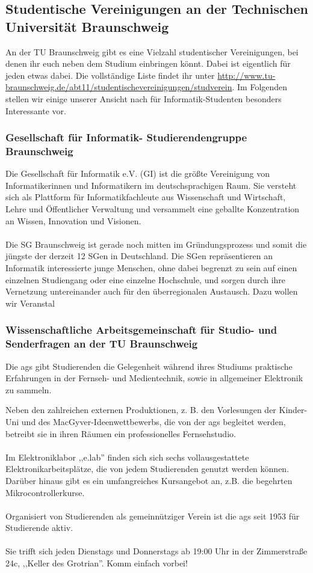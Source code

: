\subsection{Studentische Vereinigungen an der Technischen Universität
Braunschweig}
\label{vereinigungen}
	An der TU Braunschweig gibt es eine Vielzahl studentischer
	Vereinigungen, bei denen ihr euch neben dem Studium einbringen
	könnt. Dabei ist eigentlich für jeden etwas dabei. Die
	vollständige Liste findet ihr unter 
	\url{http://www.tu-braunschweig.de/abt11/studentischevereinigungen/studverein}. 
	Im Folgenden stellen wir einige unserer Ansicht nach für
	Informatik-Studenten besonders Interessante vor.

	\subsubsection{Gesellschaft für Informatik- Studierendengruppe
	Braunschweig}	
	Die Gesellschaft für Informatik e.V. (GI) ist die größte
	Vereinigung von Informatikerinnen und Informatikern im
	deutschsprachigen Raum. Sie versteht sich als Plattform für
	Informatikfachleute aus Wissenschaft und Wirtschaft, Lehre und
	Öffentlicher Verwaltung und versammelt eine geballte
	Konzentration an Wissen, Innovation und Visionen. \\\\
	 Die SG Braunschweig ist gerade noch mitten im Gründungsprozess
	 und somit die jüngste der derzeit 12 SGen in Deutschland. Die
	 SGen repräsentieren an Informatik interessierte junge Menschen,
	 ohne dabei begrenzt zu sein auf einen einzelnen Studiengang
	 oder eine einzelne Hochschule, und sorgen durch ihre Vernetzung
	 untereinander auch für den überregionalen Austausch. Dazu
	 wollen wir Veranstal 

\subsubsection{Wissenschaftliche Arbeitsgemeinschaft für Studio- und Senderfragen an der TU Braunschweig}
Die ags gibt Studierenden die Gelegenheit während ihres Studiums
praktische Erfahrungen in der Fernseh- und Medientechnik, sowie in
allgemeiner Elektronik zu sammeln. 


Neben den zahlreichen externen Produktionen, z.
B. den Vorlesungen der Kinder-Uni und des MacGyver-Ideenwettbewerbs, die
von der ags begleitet werden, betreibt sie in ihren Räumen 
ein professionelles Fernsehstudio. 
\\\\
 Im Elektroniklabor ,,e.lab'' finden sich sich sechs
 vollausgestattete Elektronikarbeitsplätze, die von jedem Studierenden
 genutzt werden können. Darüber hinaus gibt es ein umfangreiches
 Kursangebot an, z.B. die begehrten Mikrocontrollerkurse. 
\\\\
  Organisiert von Studierenden als gemeinnütziger Verein ist die ags
  seit 1953 für Studierende aktiv. 
  \\\\
   Sie trifft sich jeden Dienstags und Donnerstags ab 19:00 Uhr in der
   Zimmerstraße 24c, ,,Keller des Grotrian''. Komm einfach vorbei!

